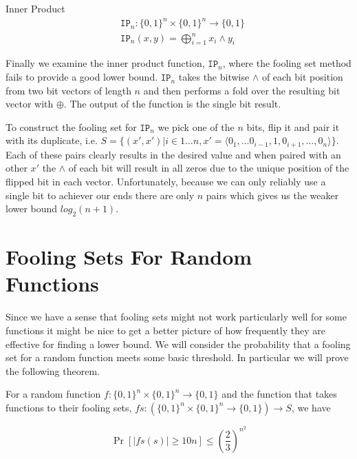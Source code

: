 \documentclass[usletter]{article}
\begin{document}
\begin{example}
  Inner Product
  \begin{align*}
    & \mathtt{IP}_n : \{0,1\}^n \times \{0,1\}^n \rightarrow \{0,1\} \\
    & \mathtt{IP}_n(x, y) = \bigoplus_{i=1}^n x_i \land y_i
  \end{align*}
\end{example}

Finally we examine the inner product function, $\mathtt{IP}_n$, where the fooling set method fails to provide a good lower bound. $\mathtt{IP}_n$ takes the bitwise $\land$ of each bit position from two bit vectors of length $n$ and then performs a fold over the resulting bit vector with $\oplus$. The output of the function is the single bit result.

To construct the fooling set for $\mathtt{IP}_n$ we pick one of the $n$ bits, flip it and pair it with its duplicate, i.e. $S = \{ (x', x') | i \in 1 \ldots n, x' = \langle 0_1, \ldots 0_{i-1},1,0_{i+1}, \ldots, 0_n \rangle \}$. Each of these pairs clearly results in the desired value and when paired with an other $x'$ the $\land$ of each bit will result in all zeros due to the unique position of the flipped bit in each vector. Unfortunately, because we can only reliably use a single bit to achiever our ends there are only $n$ pairs which gives us the weaker lower bound $log_2(n+1)$.

\section{Fooling Sets For Random Functions} \label{sec:fooling-set-random}

Since we have a sense that fooling sets might not work particularly well for some functions it might be nice to get a better picture of how frequently they are effective for finding a lower bound. We will consider the probability that a fooling set for a random function meets some basic threshold. In particular we will prove the following theorem.

\begin{theorem}
For a random function $f : \{0,1\}^n \times \{0,1\}^n \rightarrow \{0,1\}$ and the function that takes functions to their fooling sets, $fs : (\{0,1\}^n \times \{0,1\}^n \rightarrow \{0,1\}) \rightarrow S$, we have

\begin{equation*}
\Pr\left[ |fs(s)| \geq 10n \right] \leq \left(\frac{2}{3}\right)^{n^{2}}
\end{equation*}
\end{theorem}
\end{document}
